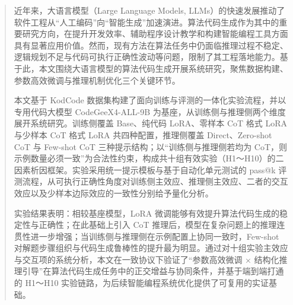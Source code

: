 \documentclass[
    decl-page,  %
  ]{njuthesis}
\begin{document}

\maketitle

\raggedbottom

\begin{abstract}
  近年来，大语言模型（Large Language Models, LLMs）的快速发展推动了软件工程从“人工编码”向“智能生成”加速演进。算法代码生成作为其中的重要研究方向，在提升开发效率、辅助程序设计教学和构建智能编程工具方面具有显著应用价值。然而，现有方法在算法任务中仍面临推理过程不稳定、逻辑规划不足与代码可执行正确性波动等问题，限制了其工程落地能力。基于此，本文围绕大语言模型的算法代码生成开展系统研究，聚焦数据构建、参数高效微调与推理机制优化三个关键环节。

  本文基于 KodCode 数据集构建了面向训练与评测的一体化实验流程，并以专用代码大模型 CodeGeeX4-ALL-9B 为基座，从训练侧与推理侧两个维度展开系统研究。训练侧覆盖 Base、纯代码 LoRA、零样本 CoT 格式 LoRA 与少样本 CoT 格式 LoRA 共四种配置，推理侧覆盖 Direct、Zero-shot CoT 与 Few-shot CoT 三种提示结构；以“训练侧与推理侧若均为 CoT，则示例数量必须一致”为合法性约束，构成共十组有效实验（H1～H10）的二因素析因框架。实验采用统一提示模板与基于自动化单元测试的 pass@k 评测流程，从可执行正确性角度对训练侧主效应、推理侧主效应、二者的交互效应以及少样本边际效应的一致性分别给予量化分析。

  实验结果表明：相较基座模型，LoRA 微调能够有效提升算法代码生成的稳定性与正确性；在此基础上引入 CoT 推理后，模型在复杂问题上的推理连贯性进一步增强；当训练侧与推理侧在示例配置上协同一致时，Few-shot 对解题步骤组织与代码生成鲁棒性的提升最为明显。通过对十组实验主效应与交互项的系统分析，本文在一致协议下验证了“参数高效微调 × 结构化推理引导”在算法代码生成任务中的正交增益与协同条件，并基于端到端打通的 H1～H10 实验链路，为后续智能编程系统优化提供了可复用的实证基础。
\end{abstract}
\end{document}
